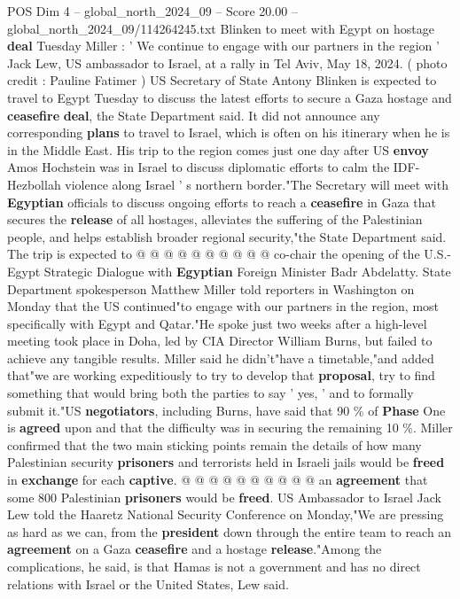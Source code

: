 \begin{textsample}{POS Dim 4 – global\_north\_2024\_09 – Score 20.00 – global\_north\_2024\_09/114264245.txt}  \label{ex:f4_pos_325}
Blinken to meet with Egypt on hostage \textbf{deal} Tuesday Miller : ' We continue to engage with our partners in the region ' Jack Lew, US ambassador to Israel, at a rally in Tel Aviv, May 18, 2024. ( photo credit : Pauline Fatimer ) US Secretary of State Antony Blinken is expected to travel to Egypt Tuesday to discuss the latest efforts to secure a Gaza hostage and \textbf{ceasefire} \textbf{deal}, the State Department said.
It did not announce any corresponding \textbf{plans} to travel to Israel, which is often on his itinerary when he is in the Middle East.
His trip to the region comes just one day after US \textbf{envoy} Amos Hochstein was in Israel to discuss diplomatic efforts to calm the IDF-Hezbollah violence along Israel ' s northern border."The Secretary will meet with \textbf{Egyptian} officials to discuss ongoing efforts to reach a \textbf{ceasefire} in Gaza that secures the \textbf{release} of all hostages, alleviates the suffering of the Palestinian people, and helps establish broader regional security,"the State Department said.
The trip is expected to @ @ @ @ @ @ @ @ @ @ co-chair the opening of the U.S.-Egypt Strategic Dialogue with \textbf{Egyptian} Foreign Minister Badr Abdelatty.
State Department spokesperson Matthew Miller told reporters in Washington on Monday that the US continued"to engage with our partners in the region, most specifically with Egypt and Qatar."He spoke just two weeks after a high-level meeting took place in Doha, led by CIA Director William Burns, but failed to achieve any tangible results.
Miller said he didn't"have a timetable,"and added that"we are working expeditiously to try to develop that \textbf{proposal}, try to find something that would bring both the parties to say ' yes, ' and to formally submit it."US \textbf{negotiators}, including Burns, have said that 90 \% of \textbf{Phase} One is \textbf{agreed} upon and that the difficulty was in securing the remaining 10 \%.
Miller confirmed that the two main sticking points remain the details of how many Palestinian security \textbf{prisoners} and terrorists held in Israeli jails would be \textbf{freed} in \textbf{exchange} for each \textbf{captive}. @ @ @ @ @ @ @ @ @ @ an \textbf{agreement} that some 800 Palestinian \textbf{prisoners} would be \textbf{freed}.
US Ambassador to Israel Jack Lew told the Haaretz National Security Conference on Monday,"We are pressing as hard as we can, from the \textbf{president} down through the entire team to reach an \textbf{agreement} on a Gaza \textbf{ceasefire} and a hostage \textbf{release}."Among the complications, he said, is that Hamas is not a government and has no direct relations with Israel or the United States, Lew said.

\end{textsample}
